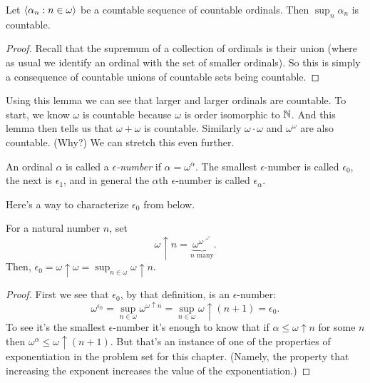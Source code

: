 \documentclass[10pt]{amsart}
\begin{document}
\begin{lemma}
Let ${\left\langle \alpha_n : n \in \omega \right\rangle}$ be a countable sequence of countable ordinals. Then $\sup_n \alpha_n$ is countable.
\end{lemma}

\begin{proof}
Recall that the supremum of a collection of ordinals is their union (where as usual we identify an ordinal with the set of smaller ordinals). So this is simply a consequence of countable unions of countable sets being countable.
\end{proof}

Using this lemma we can see that larger and larger ordinals are countable. To start, we know $\omega$ is countable because $\omega$ is order isomorphic to $\mathbb{N}$. And this lemma then tells us that $\omega + \omega$ is countable. Similarly $\omega \cdot \omega$ and $\omega^\omega$ are also countable. (Why?) We can stretch this even further.

\begin{definition}
An ordinal $\alpha$ is called a \emph{$\epsilon$-number} if $\alpha = \omega^\alpha$. The smallest $\epsilon$-number is called $\epsilon_0$, the next is $\epsilon_1$, and in general the $\alpha$th $\epsilon$-number is called $\epsilon_\alpha$.
\end{definition}

Here's a way to characterize $\epsilon_0$ from below.

\begin{proposition}
For a natural number $n$, set 
\[
\omega \uparrow n = \underbrace{\omega^{\omega^{\iddots^{\omega^\omega}}}}_{n \text{ many}}.
\]
Then, $\epsilon_0 = \omega \uparrow \omega = \sup_{n \in \omega} \omega \uparrow n$.
\end{proposition}

\begin{proof}
First we see that $\epsilon_0$, by that definition, is an $\epsilon$-number:
\[
\omega^{\epsilon_0} = \sup_{n \in \omega} \omega^{\omega \uparrow n} = \sup_{n \in \omega} \omega \uparrow (n+1) = \epsilon_0.
\]
To see it's the smallest $\epsilon$-number it's enough to know that if $\alpha \le \omega \uparrow n$ for some $n$ then $\omega^\alpha \le \omega \uparrow (n+1)$. But that's an instance of one of the properties of exponentiation in the problem set for this chapter. (Namely, the property that increasing the exponent increases the value of the exponentiation.)
\end{proof}
\end{document}

